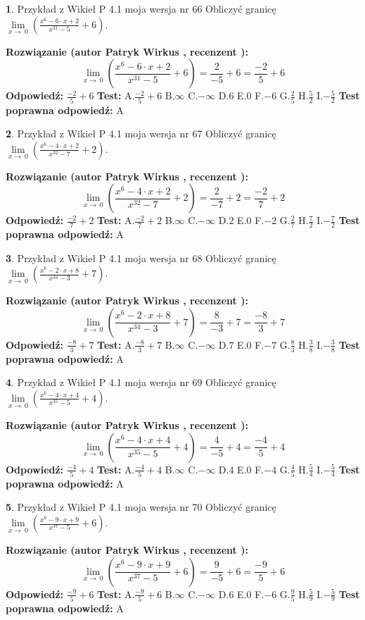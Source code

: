 \documentclass[12pt, a4paper]{article}
\theoremstyle{definition} %
\newtheorem{zad}{}
\newcommand{\zadStart}[1]{\begin{zad}#1\newline}
\newcommand{\zadStop}{\end{zad}}
\newcommand{\rozwStart}[2]{\noindent \textbf{Rozwiązanie (autor #1 , recenzent #2): }\newline}
\newcommand{\rozwStop}{\newline}
\newcommand{\odpStart}{\noindent \textbf{Odpowiedź:}\newline}
\newcommand{\odpStop}{\newline}
\newcommand{\testStart}{\noindent \textbf{Test:}\newline}
\newcommand{\testStop}{\newline}
\newcommand{\kluczStart}{\noindent \textbf{Test poprawna odpowiedź:}\newline}
\newcommand{\kluczStop}{\newline}
\begin{document}
\zadStart{Przykład z Wikieł P 4.1 moja wersja nr 66}
Obliczyć granicę $\lim\limits_{x\to\ 0}(\frac{x^{6}-6 \cdot x +2}{x^{31}-5}+6)$.
\zadStop
\rozwStart{Patryk Wirkus}{}
$$\lim\limits_{x\to\ 0}(\frac{x^{6}-6 \cdot x +2}{x^{31}-5}+6)=\frac{2}{-5}+6=\frac{-2}{5}+6$$
\rozwStop
\odpStart
$\frac{-2}{5}+6$
\odpStop
\testStart
A.$\frac{-2}{5}+6$
B.$\infty$
C.$-\infty$
D.$6$
E.$0$
F.$-6$
G.$\frac{2}{5}$
H.$\frac{5}{2}$
I.$-\frac{5}{2}$
\testStop
\kluczStart
A
\kluczStop



\zadStart{Przykład z Wikieł P 4.1 moja wersja nr 67}
Obliczyć granicę $\lim\limits_{x\to\ 0}(\frac{x^{6}-4 \cdot x +2}{x^{32}-7}+2)$.
\zadStop
\rozwStart{Patryk Wirkus}{}
$$\lim\limits_{x\to\ 0}(\frac{x^{6}-4 \cdot x +2}{x^{32}-7}+2)=\frac{2}{-7}+2=\frac{-2}{7}+2$$
\rozwStop
\odpStart
$\frac{-2}{7}+2$
\odpStop
\testStart
A.$\frac{-2}{7}+2$
B.$\infty$
C.$-\infty$
D.$2$
E.$0$
F.$-2$
G.$\frac{2}{7}$
H.$\frac{7}{2}$
I.$-\frac{7}{2}$
\testStop
\kluczStart
A
\kluczStop



\zadStart{Przykład z Wikieł P 4.1 moja wersja nr 68}
Obliczyć granicę $\lim\limits_{x\to\ 0}(\frac{x^{6}-2 \cdot x +8}{x^{34}-3}+7)$.
\zadStop
\rozwStart{Patryk Wirkus}{}
$$\lim\limits_{x\to\ 0}(\frac{x^{6}-2 \cdot x +8}{x^{34}-3}+7)=\frac{8}{-3}+7=\frac{-8}{3}+7$$
\rozwStop
\odpStart
$\frac{-8}{3}+7$
\odpStop
\testStart
A.$\frac{-8}{3}+7$
B.$\infty$
C.$-\infty$
D.$7$
E.$0$
F.$-7$
G.$\frac{8}{3}$
H.$\frac{3}{8}$
I.$-\frac{3}{8}$
\testStop
\kluczStart
A
\kluczStop



\zadStart{Przykład z Wikieł P 4.1 moja wersja nr 69}
Obliczyć granicę $\lim\limits_{x\to\ 0}(\frac{x^{6}-4 \cdot x +4}{x^{35}-5}+4)$.
\zadStop
\rozwStart{Patryk Wirkus}{}
$$\lim\limits_{x\to\ 0}(\frac{x^{6}-4 \cdot x +4}{x^{35}-5}+4)=\frac{4}{-5}+4=\frac{-4}{5}+4$$
\rozwStop
\odpStart
$\frac{-4}{5}+4$
\odpStop
\testStart
A.$\frac{-4}{5}+4$
B.$\infty$
C.$-\infty$
D.$4$
E.$0$
F.$-4$
G.$\frac{4}{5}$
H.$\frac{5}{4}$
I.$-\frac{5}{4}$
\testStop
\kluczStart
A
\kluczStop



\zadStart{Przykład z Wikieł P 4.1 moja wersja nr 70}
Obliczyć granicę $\lim\limits_{x\to\ 0}(\frac{x^{6}-9 \cdot x +9}{x^{37}-5}+6)$.
\zadStop
\rozwStart{Patryk Wirkus}{}
$$\lim\limits_{x\to\ 0}(\frac{x^{6}-9 \cdot x +9}{x^{37}-5}+6)=\frac{9}{-5}+6=\frac{-9}{5}+6$$
\rozwStop
\odpStart
$\frac{-9}{5}+6$
\odpStop
\testStart
A.$\frac{-9}{5}+6$
B.$\infty$
C.$-\infty$
D.$6$
E.$0$
F.$-6$
G.$\frac{9}{5}$
H.$\frac{5}{9}$
I.$-\frac{5}{9}$
\testStop
\kluczStart
A
\kluczStop
\end{document}

